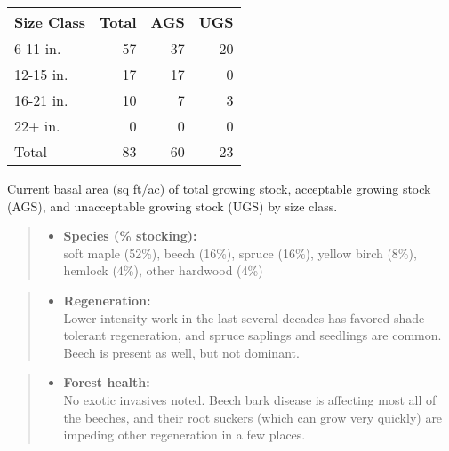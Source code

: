 \documentclass[]{tufte-handout}
\providecommand{\tightlist}{%
  \setlength{\itemsep}{0pt}\setlength{\parskip}{0pt}}
\begin{document}
\begin{tabular}{lrrr}
\toprule
Size Class & Total & AGS & UGS\\
\midrule
6-11 in. & 57 & 37 & 20\\
12-15 in. & 17 & 17 & 0\\
16-21 in. & 10 & 7 & 3\\
22+ in. & 0 & 0 & 0\\
Total & 83 & 60 & 23\\
\bottomrule
\end{tabular}

\vspace{2pt}
\footnotesize\parbox{200pt}{Current basal area (sq ft/ac) of total growing stock, acceptable growing stock (AGS), and unacceptable growing stock (UGS) by size class.}\normalsize

\begin{quote}
\begin{itemize}
\tightlist
\item
  \textbf{Species (\% stocking):}\\
  \vspace{2pt} soft maple (52\%), beech (16\%), spruce (16\%), yellow
  birch (8\%), hemlock (4\%), other hardwood (4\%)
\end{itemize}
\end{quote}

\begin{quote}
\begin{itemize}
\tightlist
\item
  \textbf{Regeneration:}\\
  \vspace{2pt} Lower intensity work in the last several decades has
  favored shade-tolerant regeneration, and spruce saplings and seedlings
  are common. Beech is present as well, but not dominant.
\end{itemize}
\end{quote}

\begin{quote}
\begin{itemize}
\tightlist
\item
  \textbf{Forest health:}\\
  \vspace{2pt} No exotic invasives noted. Beech bark disease is
  affecting most all of the beeches, and their root suckers (which can
  grow very quickly) are impeding other regeneration in a few places.
\end{itemize}
\end{quote}
\end{document}
